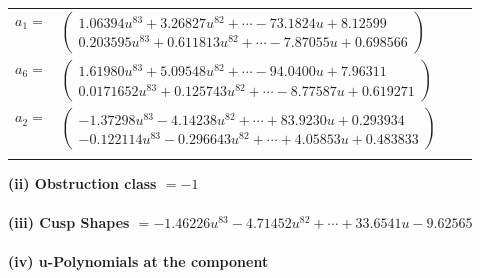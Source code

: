 \documentclass[1p]{elsarticle_modified}
\theoremstyle{definition}
\begin{document}
\begin{tabular}{m{7pt} m{180pt} m{7pt} m{180pt} }
\flushright $a_{1}=$&$\begin{pmatrix}1.06394 u^{83}+3.26827 u^{82}+\cdots-73.1824 u+8.12599\\0.203595 u^{83}+0.611813 u^{82}+\cdots-7.87055 u+0.698566\end{pmatrix}$ \\
\flushright $a_{6}=$&$\begin{pmatrix}1.61980 u^{83}+5.09548 u^{82}+\cdots-94.0400 u+7.96311\\0.0171652 u^{83}+0.125743 u^{82}+\cdots-8.77587 u+0.619271\end{pmatrix}$ \\
\flushright $a_{2}=$&$\begin{pmatrix}-1.37298 u^{83}-4.14238 u^{82}+\cdots+83.9230 u+0.293934\\-0.122114 u^{83}-0.296643 u^{82}+\cdots+4.05853 u+0.483833\end{pmatrix}$\\&\end{tabular}
\flushleft \textbf{(ii) Obstruction class $= -1$}\\~\\
\flushleft \textbf{(iii) Cusp Shapes $= -1.46226 u^{83}-4.71452 u^{82}+\cdots+33.6541 u-9.62565$}\\~\\
\newpage\renewcommand{\arraystretch}{1}
\flushleft \textbf{(iv) u-Polynomials at the component}\newline \\
\end{document}
